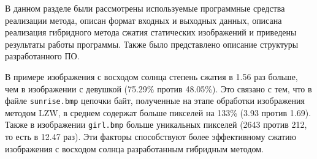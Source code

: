 В данном разделе были рассмотрены используемые программные средства реализации метода, описан формат входных и выходных данных, описана реализация гибридного метода сжатия статических изображений и приведены результаты работы программы. Также было представлено описание структуры разработанного ПО.

В примере изображения с восходом солнца степень сжатия в 1.56 раз больше, чем в изображении с девушкой (75.29\% против 48.05\%). Это связано с тем, что в файле \texttt{sunrise.bmp} цепочки байт, полученные на этапе обработки изображения методом LZW, в среднем содержат больше пикселей на 133\% (3.93 против 1.69). Также в изображении \texttt{girl.bmp} больше уникальных пикселей (2643 против 212, то есть в 12.47 раз). Эти факторы способствуют более эффективному сжатию изображения с восходом солнца разработанным гибридным методом.
